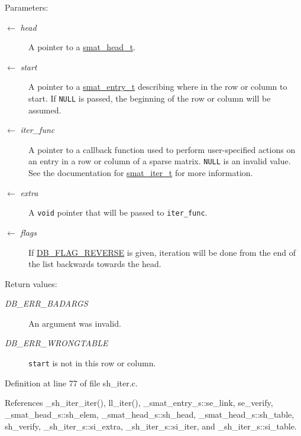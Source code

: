 \begin{Desc}
\item[Parameters:]
\begin{description}
\item[\mbox{$\leftarrow$} {\em head}]A pointer to a \hyperlink{group__dbprim__smat_ga1}{smat\_\-head\_\-t}. \item[\mbox{$\leftarrow$} {\em start}]A pointer to a \hyperlink{group__dbprim__smat_ga2}{smat\_\-entry\_\-t} describing where in the row or column to start. If {\tt NULL} is passed, the beginning of the row or column will be assumed. \item[\mbox{$\leftarrow$} {\em iter\_\-func}]A pointer to a callback function used to perform user-specified actions on an entry in a row or column of a sparse matrix. {\tt NULL} is an invalid value. See the documentation for \hyperlink{group__dbprim__smat_ga4}{smat\_\-iter\_\-t} for more information. \item[\mbox{$\leftarrow$} {\em extra}]A {\tt void} pointer that will be passed to {\tt iter\_\-func}. \item[\mbox{$\leftarrow$} {\em flags}]If \hyperlink{group__dbprim_ga4}{DB\_\-FLAG\_\-REVERSE} is given, iteration will be done from the end of the list backwards towards the head.\end{description}
\end{Desc}
\begin{Desc}
\item[Return values:]
\begin{description}
\item[{\em DB\_\-ERR\_\-BADARGS}]An argument was invalid. \item[{\em DB\_\-ERR\_\-WRONGTABLE}]{\tt start} is not in this row or column.\end{description}
\end{Desc}


Definition at line 77 of file sh\_\-iter.c.

References \_\-sh\_\-iter\_\-iter(), ll\_\-iter(), \_\-smat\_\-entry\_\-s::se\_\-link, se\_\-verify, \_\-smat\_\-head\_\-s::sh\_\-elem, \_\-smat\_\-head\_\-s::sh\_\-head, \_\-smat\_\-head\_\-s::sh\_\-table, sh\_\-verify, \_\-sh\_\-iter\_\-s::si\_\-extra, \_\-sh\_\-iter\_\-s::si\_\-iter, and \_\-sh\_\-iter\_\-s::si\_\-table.

